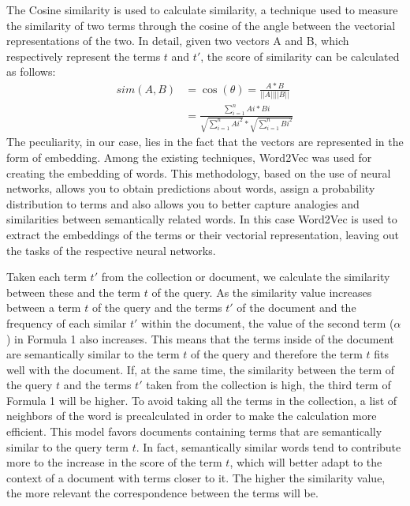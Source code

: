The Cosine similarity is used to calculate similarity, a technique used to measure the similarity of two terms through the cosine of the angle between the vectorial representations of the two.
In detail, given two vectors A and B, which respectively represent the terms $t$ and ${t}'$, the score of similarity can be calculated as follows:
\begin{equation}
    \begin{split}
        sim(A,B) & =\cos(\theta)=\frac{A*B}{||A||||B||}\\
                 & =\frac{\sum_{i=1}^{n}Ai*Bi}{\sqrt{\sum_{i=1}^{n}Ai^{2}}*{\sqrt{\sum_{i=1}^{n}Bi^{2}}}}
    \end{split}
\end{equation}
The peculiarity, in our case, lies in the fact that the vectors are represented in the form of embedding.
Among the existing techniques, Word2Vec was used for creating the embedding of words.
This methodology, based on the use of neural networks, allows you to obtain predictions about words, assign a probability distribution to terms and also allows you to better capture analogies and similarities between semantically related words.
In this case Word2Vec is used to extract the embeddings of the terms or their vectorial representation, leaving out the tasks of the respective neural networks.

Taken each term ${t}'$ from the collection or document, we calculate the similarity between these and the term $t$ of the query.
As the similarity value increases between a term $t$ of the query and the terms ${t}'$ of the document and the frequency of each similar ${t}'$ within the document, the value of the second term (\(\alpha\)) in Formula 1 also increases.
This means that the terms inside of the document are semantically similar to the term $t$ of the query and therefore the term $t$ fits well with the document.
If, at the same time, the similarity between the term of the query $t$ and the terms ${t}'$ taken from the collection is high, the third term of Formula 1 will be higher. To avoid taking all the terms in the collection, a list of neighbors of the word is precalculated in order to make the calculation more efficient.
This model favors documents containing terms that are semantically similar to the query term $t$.
In fact, semantically similar words tend to contribute more to the increase in the score of the term $t$, which will better adapt to the context of a document with terms closer to it. The higher the similarity value, the more relevant the correspondence between the terms will be.
